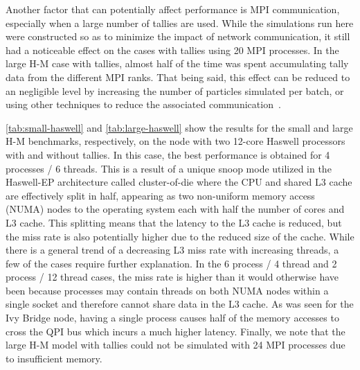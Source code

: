 \documentclass{mc2015}
\begin{document}
Another factor that can potentially affect performance is MPI communication,
especially when a large number of tallies are used. While the simulations run
here were constructed so as to minimize the impact of network communication, it
still had a noticeable effect on the cases with tallies using 20 MPI
processes. In the large H-M case with tallies, almost half of the time was spent
accumulating tally data from the different MPI ranks. That being said,
this effect can be reduced to an negligible level by increasing the number of
particles simulated per batch, or using other techniques to reduce the
associated communication~\cite{trans-romano-2012}.

\autoref{tab:small-haswell} and \autoref{tab:large-haswell} show the results for
the small and large H-M benchmarks, respectively, on the node with two 12-core
Haswell processors with and without tallies. In this case, the best performance
is obtained for 4 processes / 6 threads. This is a result of a unique snoop mode
utilized in the Haswell-EP architecture called cluster-of-die where the CPU and
shared L3 cache are effectively split in half, appearing as two non-uniform
memory access (NUMA) nodes to the operating system each with half the number of
cores and L3 cache. This splitting means that the latency to the L3 cache is
reduced, but the miss rate is also potentially higher due to the reduced size of
the cache. While there is a general trend of a decreasing L3 miss rate with
increasing threads, a few of the cases require further explanation. In the 6
process / 4 thread and 2 process / 12 thread cases, the miss rate is higher than
it would otherwise have been because processes may contain threads on both NUMA
nodes within a single socket and therefore cannot share data in the L3 cache. As
was seen for the Ivy Bridge node, having a single process causes half of the
memory accesses to cross the QPI bus which incurs a much higher
latency. Finally, we note that the large H-M model with tallies could not be
simulated with 24 MPI processes due to insufficient memory.
\end{document}
